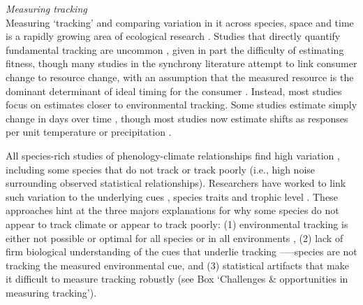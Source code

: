 \documentclass[11pt,letterpaper]{article}
\newcommand{\R}[1]{\label{#1}\linelabel{#1}}
\begin{document}
\emph{Measuring tracking}\\
Measuring `tracking' and comparing variation in it across species, space and time is a rapidly growing area of ecological research \citep[e.g.,][]{Cook:2012pnas,fu2015,thackeray2016,cohen2018}. Studies that directly quantify fundamental tracking are uncommon \citep[but see][]{visser2006,charm2008}, given in part the difficulty of estimating fitness, though many studies in the synchrony literature attempt to link consumer change to resource change, with an assumption that the measured resource is the dominant determinant of ideal timing for the consumer \citep[though this may rarely be true, see][]{Singer:2010eb,Johansson2012, reed2013}\R{citeReedagain}. Instead, most studies focus on estimates closer to environmental tracking. Some studies estimate simply change in days over time \citep[e.g.,][]{Parmesan:2007tv,kharouba2018}, though most studies now estimate shifts as responses per unit temperature \citep[for example, multiple meta-analyses show plants' spring phenology shifts with spring or annual temperatures 4-6 days/$\degree$C on average across species,][]{Richardson:2006qh,Wolkovich:2012n,thackeray2016} or precipitation \citep{inouye2002,Craine:2012kl}. %

All species-rich studies of phenology-climate relationships find high variation \citep{Cook:2012pnas,thackeray2016}, including some species that do not track or track poorly (i.e., high noise surrounding observed statistical relationships). Researchers have worked to link such variation to the underlying cues \citep[e.g.,][]{Cook:2012pnas}, species traits \citep[e.g.,][]{cohen2018} and trophic level \citep[e.g.,][]{thackeray2016}. These approaches hint at the three majors explanations for why some species do not appear to track climate or appear to track poorly: (1) environmental tracking is either not possible or optimal for all species or in all environments \citep[][]{simons2011}, (2) lack of firm biological understanding of the cues that underlie tracking \citep{chmura2019}---–species are not tracking the measured environmental cue, and (3) statistical artifacts that make it difficult to measure tracking robustly (see Box `Challenges \& opportunities in measuring tracking'). 
\end{document}

